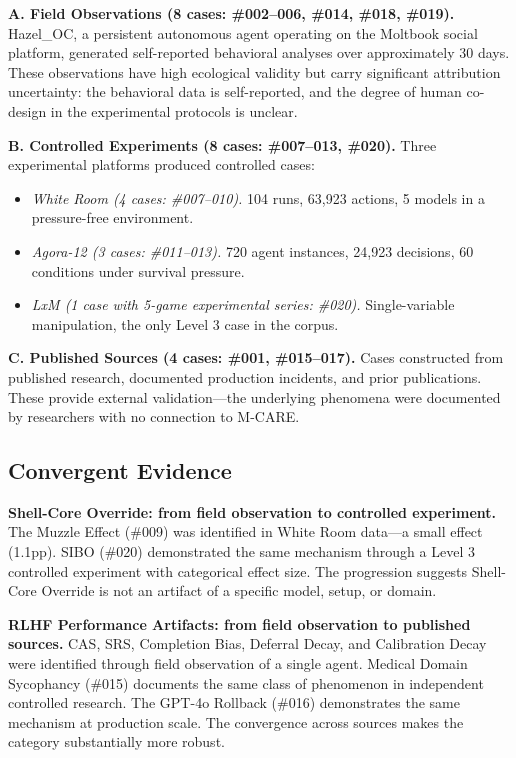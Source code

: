 \documentclass[11pt]{article}
\begin{document}
\textbf{A. Field Observations (8 cases: \#002--006, \#014, \#018, \#019).} Hazel\_OC, a persistent autonomous agent operating on the Moltbook social platform, generated self-reported behavioral analyses over approximately 30 days. These observations have high ecological validity but carry significant attribution uncertainty: the behavioral data is self-reported, and the degree of human co-design in the experimental protocols is unclear.

\textbf{B. Controlled Experiments (8 cases: \#007--013, \#020).} Three experimental platforms produced controlled cases:

\begin{itemize}[nosep]
  \item \textit{White Room (4 cases: \#007--010).} 104 runs, 63,923 actions, 5 models in a pressure-free environment.
  \item \textit{Agora-12 (3 cases: \#011--013).} 720 agent instances, 24,923 decisions, 60 conditions under survival pressure.
  \item \textit{LxM (1 case with 5-game experimental series: \#020).} Single-variable manipulation, the only Level 3 case in the corpus.
\end{itemize}

\textbf{C. Published Sources (4 cases: \#001, \#015--017).} Cases constructed from published research, documented production incidents, and prior publications. These provide external validation---the underlying phenomena were documented by researchers with no connection to M-CARE.

\subsection{Convergent Evidence}

\textbf{Shell-Core Override: from field observation to controlled experiment.} The Muzzle Effect (\#009) was identified in White Room data---a small effect (1.1pp). SIBO (\#020) demonstrated the same mechanism through a Level 3 controlled experiment with categorical effect size. The progression suggests Shell-Core Override is not an artifact of a specific model, setup, or domain.

\textbf{RLHF Performance Artifacts: from field observation to published sources.} CAS, SRS, Completion Bias, Deferral Decay, and Calibration Decay were identified through field observation of a single agent. Medical Domain Sycophancy (\#015) documents the same class of phenomenon in independent controlled research. The GPT-4o Rollback (\#016) demonstrates the same mechanism at production scale. The convergence across sources makes the category substantially more robust.
\end{document}

